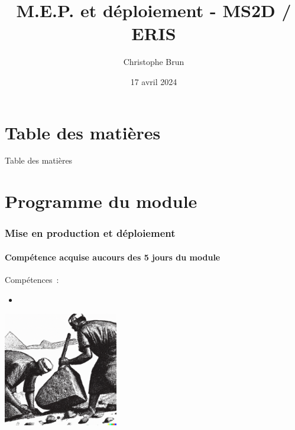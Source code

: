 \documentclass{beamer}
\title{M.E.P. et déploiement - MS2D / ERIS}
\author{Christophe Brun}
\institute{Campus Saint-Michel IT}
\date{17 avril 2024}
\begin{document}
    \begin{frame}
        \transdissolve
        \titlepage
    \end{frame}


    \section{Table des matières}\label{sec:toc}

    \begin{frame}{Table des matières}
        \tableofcontents
    \end{frame}


    \section{Programme du module}\label{sec:programme-du-module}

    \begin{frame}
        \frametitle{Mise en production et déploiement}
        \framesubtitle{Compétence acquise aucours des 5 jours du module}
        \transdissolve
        Compétences~:
        \begin{itemize}
            \item {}
        \end{itemize}
        \bigbreak
        \centering
        \includegraphics[width=5cm]{image/engraving-of-egyptian-workers-pulling-stones.png}
    \end{frame}
\end{document}
